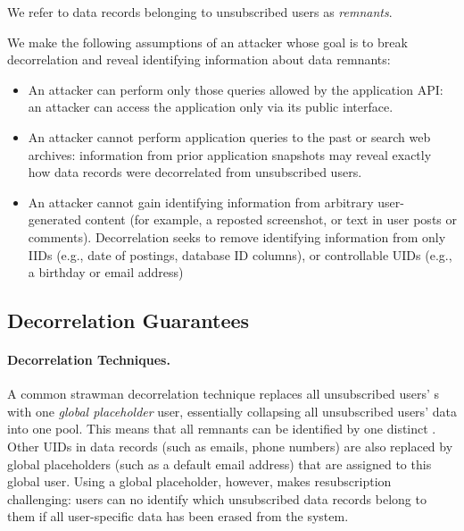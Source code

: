 We refer to data records belonging
to unsubscribed users as \emph{remnants}.

We make the following assumptions of an attacker whose goal is to break decorrelation and reveal
identifying information about data remnants:

\begin{itemize}
    \item An attacker can perform only those queries allowed by the application API: an
attacker can access the application only via its public interface. 

\item An attacker cannot perform application queries to the past or search web archives:
information from prior application snapshots may reveal 
exactly how data records were decorrelated from unsubscribed users. 

\item An attacker cannot gain identifying information from arbitrary user-generated content (for
    example, a reposted screenshot, or text in user posts or comments).  Decorrelation seeks to
        remove identifying information from only IIDs (e.g., date of postings,
        database ID columns), or controllable UIDs (e.g., a birthday or email address)
\end{itemize}

\subsection{Decorrelation Guarantees} 
\paragraph{Decorrelation Techniques.}
A common strawman decorrelation technique replaces all unsubscribed users' \uidkey{}s with
one \emph{global placeholder} user, essentially collapsing all unsubscribed users' data into one pool.
This means that all remnants can be identified by one distinct \gidkey{}.
Other UIDs in data records (such as emails, phone numbers) are also replaced by global placeholders
(such as a default email address) that are assigned to this global user.
Using a global placeholder, however, makes resubscription challenging: users can no identify which unsubscribed data records belong to them if all user-specific data has been erased from the
system. 


